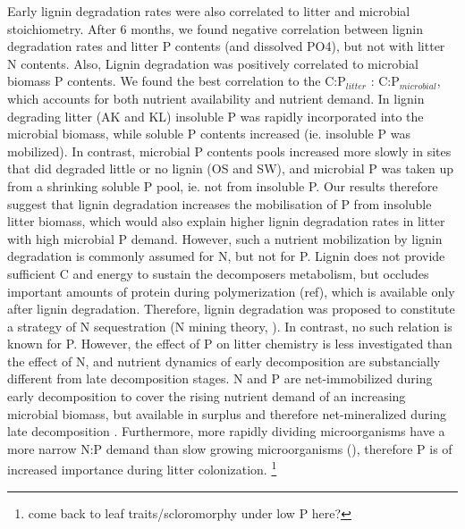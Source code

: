 
Early lignin degradation rates were also correlated to litter and microbial stoichiometry. After 6 months, we found negative correlation between lignin degradation rates and litter P contents (and dissolved PO4), but not with litter N contents. Also, Lignin degradation was positively correlated to microbial biomass P contents. We found the best correlation to the C:P$_{litter}$ : C:P$_{microbial}$, which accounts for both nutrient availability and nutrient demand. In lignin degrading litter (AK and KL) insoluble P was rapidly incorporated into the microbial biomass, while soluble P contents increased (ie. insoluble P was mobilized). In contrast, microbial P contents pools increased more slowly in sites that did degraded little or no lignin (OS and SW), and microbial P was taken up from a shrinking soluble P pool, ie. not from insoluble P. Our results therefore suggest that lignin degradation increases the mobilisation of P from insoluble litter biomass, which would also explain higher lignin degradation rates in litter with high microbial P demand. However, such a nutrient mobilization by lignin degradation is commonly assumed for N, but not for P. Lignin does not provide sufficient C and energy to sustain the decomposers metabolism, but occludes important amounts of protein during polymerization (ref), which is available only after lignin degradation. Therefore, lignin degradation was proposed to constitute a strategy of N sequestration (N mining theory, \cite{Sinsabaugh2006, Craine2007}). In contrast, no such relation is known for P.  However, the effect of P on litter chemistry is less investigated than the effect of N, and nutrient dynamics of early decomposition are substancially different from late decomposition stages. N and P are net-immobilized during early decomposition to cover the rising nutrient demand of an increasing microbial biomass, but available in surplus and therefore net-mineralized during late decomposition \cite{Manzoni2010}. Furthermore, more rapidly dividing microorganisms have a more narrow N:P demand than slow growing microorganisms (\cite{Keiblinger2010}), therefore P is of increased importance during litter colonization. \footnote{come back to leaf traits/scloromorphy under low P here?}

